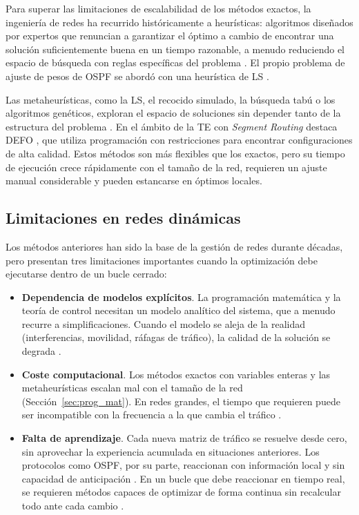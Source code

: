 Para superar las limitaciones de escalabilidad de los métodos exactos, la ingeniería de redes ha recurrido históricamente a heurísticas: algoritmos diseñados por expertos que renuncian a garantizar el óptimo a cambio de encontrar una solución suficientemente buena en un tiempo razonable, a menudo reduciendo el espacio de búsqueda con reglas específicas del problema \cite{meng2020topology}. El propio problema de ajuste de pesos de OSPF se abordó con una heurística de LS \cite{fortz2000internet}.

Las metaheurísticas, como la LS, el recocido simulado, la búsqueda tabú o los algoritmos genéticos, exploran el espacio de soluciones sin depender tanto de la estructura del problema \cite{bello2016neural}. En el ámbito de la TE con \textit{Segment Routing} destaca DEFO \cite{hartert2015declarative}, que utiliza programación con restricciones para encontrar configuraciones de alta calidad. Estos métodos son más flexibles que los exactos, pero su tiempo de ejecución crece rápidamente con el tamaño de la red, requieren un ajuste manual considerable y pueden estancarse en óptimos locales.

\subsection{Limitaciones en redes dinámicas}\label{sec:limitaciones}

Los métodos anteriores han sido la base de la gestión de redes durante décadas, pero presentan tres limitaciones importantes cuando la optimización debe ejecutarse dentro de un bucle cerrado:

\begin{itemize}
	\item \textbf{Dependencia de modelos explícitos}. La programación matemática y la teoría de control necesitan un modelo analítico del sistema, que a menudo recurre a simplificaciones. Cuando el modelo se aleja de la realidad (interferencias, movilidad, ráfagas de tráfico), la calidad de la solución se degrada \cite{yang2022comparative}.
	\item \textbf{Coste computacional}. Los métodos exactos con variables enteras y las metaheurísticas escalan mal con el tamaño de la red (Sección~\ref{sec:prog_mat}). En redes grandes, el tiempo que requieren puede ser incompatible con la frecuencia a la que cambia el tráfico \cite{li2023topology}.
	\item \textbf{Falta de aprendizaje}. Cada nueva matriz de tráfico se resuelve desde cero, sin aprovechar la experiencia acumulada en situaciones anteriores. Los protocolos como OSPF, por su parte, reaccionan con información local y sin capacidad de anticipación \cite{he2023routing,xiao2023cognitive}. En un bucle que debe reaccionar en tiempo real, se requieren métodos capaces de optimizar de forma continua sin recalcular todo ante cada cambio \cite{abo2024toward}.
\end{itemize}

